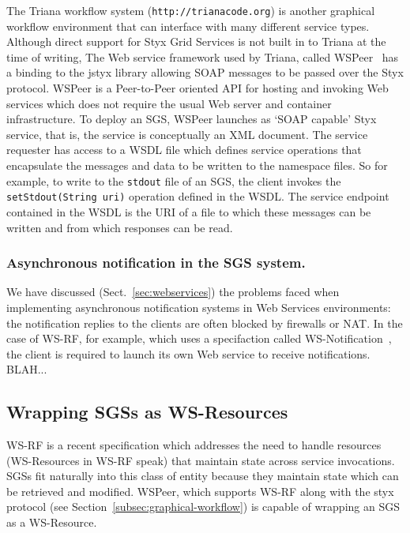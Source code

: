 \documentclass{llncs}
\begin{document}
The Triana workflow system ({\tt http://trianacode.org}) is another graphical workflow environment that can interface with many different service types.  Although direct support for Styx Grid Services is not built in to Triana at the time of writing, The Web service framework used by Triana, called WSPeer~\cite{wspeer} has a binding to the jstyx library allowing SOAP messages to be passed over the Styx protocol. WSPeer is a Peer-to-Peer oriented API for hosting and invoking Web services which does not require the usual Web server and container infrastructure. To deploy an SGS, WSPeer launches as `SOAP capable' Styx service, that is, the service is conceptually an XML document. The service requester has access to a WSDL file which defines service operations that encapsulate the messages and data to be written to the namespace files. So for example, to write to the \texttt{stdout} file of an SGS, the client invokes the \texttt{setStdout(String uri)} operation defined in the WSDL. The service endpoint contained in the WSDL is the URI of a file to which these messages can be written and from which responses can be read.

\subsubsection{Asynchronous notification in the SGS system.}
\label{subsec:async-notification}
We have discussed (Sect.~\ref{sec:webservices}) the problems faced when implementing asynchronous notification systems in Web Services environments: the notification replies to the clients are often blocked by firewalls or NAT. In the case of WS-RF, for example, which uses a specifaction called WS-Notification~\cite{wsrf-notification}, the client is required to launch its own Web service to receive notifications. BLAH...

\subsection{Wrapping SGSs as WS-Resources}
\label{subsec:ws-resources}

WS-RF is a recent specification which addresses the need to handle resources (WS-Resources in WS-RF speak) that maintain state across service invocations. SGSs fit naturally into this class of entity because they maintain state which can be retrieved and modified. WSPeer, which supports WS-RF along with the styx protocol (see Section~\ref{subsec:graphical-workflow}) is capable of wrapping an SGS as a WS-Resource.
\end{document}
